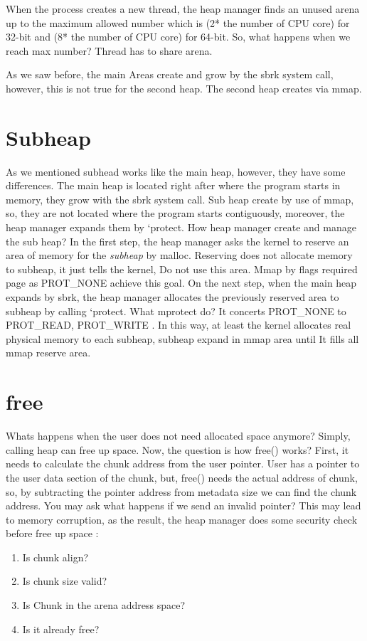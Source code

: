 \documentclass{masterthesis}
\begin{document}
When the process creates a new thread, the heap manager finds an unused arena up to the maximum allowed number which is (2* the number of CPU core) for 32-bit and (8* the number of CPU core) for 64-bit. So, what happens when we reach max number? Thread has to share arena.

As we saw before, the main Areas create and grow by the sbrk system call, however, this is not true for the second heap. The second heap creates via mmap.

\section{Subheap}
As we mentioned subhead works like the main heap, however, they have some differences. The main heap is located right after where the program starts in memory, they grow with the sbrk system call. Sub heap create by use of mmap, so, they are not located where the program starts contiguously, moreover, the heap manager expands them by ‘protect.
How heap manager create and manage the sub heap? In the first step, the heap manager asks the kernel to reserve an area of memory for the \emph{subheap} by malloc. Reserving does not allocate memory to subheap, it just tells the kernel, Do not use this area. Mmap by flags required page as PROT\_NONE achieve this goal.
On the next step, when the main heap expands by sbrk, the heap manager allocates the previously reserved area to subheap by calling ‘protect. What mprotect do? It concerts PROT\_NONE to PROT\_READ, PROT\_WRITE . In this way, at least the kernel allocates real physical memory to each subheap, subheap expand in mmap area until It fills all mmap reserve area.

\section{free}
Whats happens when the user does not need allocated space anymore? Simply, calling heap can free up space. Now, the question is how free() works? First, it needs to calculate the chunk address from the user pointer. User has a pointer to the user data section of the chunk, but, free() needs the actual address of chunk, so, by subtracting the pointer address from metadata size we can find the chunk address. You may ask what happens if we send an invalid pointer? This may lead to memory corruption, as the result, the heap manager does some security check before free up space :

\begin{enumerate}
	\item Is chunk align? 
	\item Is chunk size valid?
	\item Is Chunk in the arena address space?
	\item Is it already free?
\end{enumerate}
\end{document}
